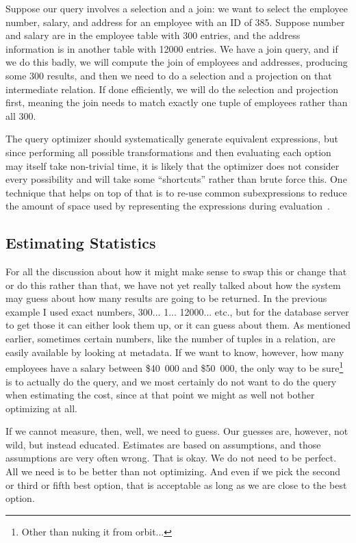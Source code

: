\documentclass[a4paper]{report}
\begin{document}
Suppose our query involves a selection and a join: we want to select the employee number, salary, and address for an employee with an ID of 385. Suppose number and salary are in the employee table with 300 entries, and the address information is in another table with 12000 entries. We have a join query, and if we do this badly, we will compute the join of employees and addresses, producing some 300 results, and then we need to do a selection and a projection on that intermediate relation. If done efficiently, we will do the selection and projection first, meaning the join needs to match exactly one tuple of employees rather than all 300. 

The query optimizer should systematically generate equivalent expressions, but since performing all possible transformations and then evaluating each option may itself take non-trivial time, it is likely that the optimizer does not consider every possibility and will take some ``shortcuts'' rather than brute force this. One technique that helps on top of that is to re-use common subexpressions to reduce the amount of space used by representing the expressions during evaluation~\cite{dsc}.

\subsection*{Estimating Statistics}

For all the discussion about how it might make sense to swap this or change that or do this rather than that, we have not yet really talked about how the system may guess about how many results are going to be returned. In the previous example I used exact numbers, 300... 1... 12000... etc., but for the database server to get those it can either look them up, or it can guess about them. As mentioned earlier, sometimes certain numbers, like the number of tuples in a relation, are easily available by looking at metadata. If we want to know, however, how many employees have a salary between \$40~000 and \$50~000, the only way to be sure\footnote{Other than nuking it from orbit...} is to actually do the query, and we most certainly do not want to do the query when estimating the cost, since at that point we might as well not bother optimizing at all.

If we cannot measure, then, well, we need to guess. Our guesses are, however, not wild, but instead educated. Estimates are based on assumptions, and those assumptions are very often wrong. That is okay. We do not need to be perfect. All we need is to be better than not optimizing. And even if we pick the second or third or fifth best option, that is acceptable as long as we are close to the best option.
\end{document}

